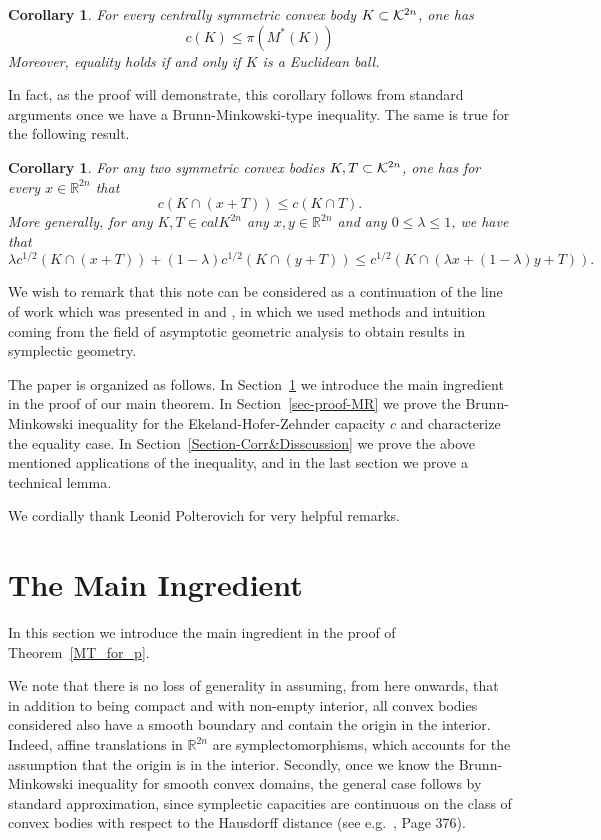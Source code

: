 \documentclass[12pt]{article}
\newtheorem{corollary}[lemma]{Corollary}
\def\R{{\mathbb R}}
\begin{document}
\begin{corollary} \label{Corr-Mean-Width}
For every centrally symmetric convex body $K \subset {\cal K}^{2n}$,
one has
$$ c(K) \leq \pi (M^*(K))
$$ Moreover, equality holds if and only if $K$ is a Euclidean ball.
\end{corollary}

In fact, as the proof will demonstrate, this corollary follows from
standard arguments once we have a Brunn-Minkowski-type inequality.
The same is true for the following result.

\begin{corollary} \label{Corr-intersections}
For any two symmetric convex bodies $K,T \subset {\cal K}^{2n}$, one
has for every $x\in \R^{2n}$ that
%
\[
c(K\cap (x+T)) \leq c(K \cap T).\] More generally, for any $K, T\in
{cal K}^{2n}$ any $x,y \in \R^{2n}$ and any $0\le \lambda\le 1$, we
have that
\[ \lambda c^{1/2}(K \cap (x+T)) + (1-\lambda)  c^{1/2}(K \cap
(y+T)) \le c^{1/2}(K \cap (\lambda x+(1-\lambda) y+ T)).\]
\end{corollary}


We wish to remark that this note can be considered as a continuation
of the line of work which was presented in \cite{AO} and \cite{AMO},
in which we used methods and intuition coming from the field of
asymptotic geometric analysis to obtain results in symplectic
geometry.

 The paper is organized as
follows. In Section~\ref{sec_main_ing} we introduce the main
ingredient in the proof of our main theorem. In
Section~\ref{sec-proof-MR} we prove the Brunn-Minkowski inequality
for the Ekeland-Hofer-Zehnder capacity $c$ and characterize the
equality case. In Section~\ref{Section-Corr&Disscussion} we prove
the above mentioned applications of the inequality, and in the last
section we prove a technical lemma.

 We cordially thank Leonid
Polterovich for very helpful remarks.

\section{The Main Ingredient} \label{sec_main_ing}

In this section we introduce the main ingredient in the proof of
Theorem~\ref{MT_for_p}.

We note that there is no loss of generality in assuming, from here
onwards, that in addition to being compact and with non-empty
interior, all  convex bodies considered also have a smooth boundary
and contain the origin in the interior. Indeed, affine translations
in ${\mathbb R}^{2n}$ are symplectomorphisms, which accounts for the
assumption that the origin is in the interior. Secondly, once we
know the Brunn-Minkowski inequality for smooth convex domains, the
general case follows by standard approximation, since symplectic
capacities are continuous on the class of convex bodies with respect
to the Hausdorff distance (see e.g.~\cite{McS}, Page 376).
\end{document}
